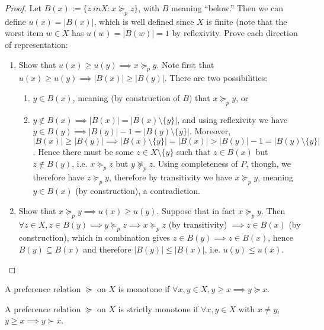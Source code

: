 \begin{proof}
  Let $B(x) := \{ z\ in X : x \succeq_p z \}$, with $B$ meaning
  ``below.'' Then we can define $u(x) = |B(x)|$, which is well defined
  since $X$ is finite (note that the worst item $w \in X$ has $u(w) =
  |B(w)| = 1$ by reflexivity. Prove each direction of representation:
  \begin{enumerate}
  \item Show that $u(x) \geq u(y) \implies x \succeq_p y$. Note
    first that $u(x) \geq u(y) \implies |B(x)| \geq |B(y)|$. There
    are two possibilities:
    \begin{enumerate}
    \item $y \in B(x)$, meaning (by construction of $B$) that $x
      \succeq_p y$, or
    \item $y \not\in B(x) \implies |B(x)| = |B(x) \setminus \{y\}|$,
      and using reflexivity we have $y \in B(y) \implies |B(y)| - 1 =
      |B(y) \setminus \{y\}|$. Moreover, $|B(x)| \geq |B(y)| \implies
      |B(x) \setminus \{y\}| = |B(x)| > |B(y)| - 1 = |B(y) \setminus
      \{y\}|$. Hence there must be some $z \in X \setminus \{y\}$ such
      that $z \in B(x)$ but $z \not\in B(y)$, i.e. $x \succeq_p z$ but
      $y \not\succeq_p z$. Using completeness of $P$, though, we
      therefore have $z \succeq_p y$, therefore by transitivity we
      have $x \succeq_p y$, meaning $y \in B(x)$ (by construction), a
      contradiction.
    \end{enumerate}
  \item Show that $x \succeq_p y \implies u(x) \geq u(y)$. Suppose
    that in fact $x \succeq_p y$. Then $\forall z \in X, z \in B(y)
    \implies y \succeq_p z \implies x \succeq_p z$ (by transitivity)
    $\implies z \in B(x)$ (by construction), which in combination
    gives $z \in B(y) \implies z \in B(x)$, hence $B(y) \subseteq
    B(x)$ and therefore $|B(y)| \leq |B(x)|$, i.e. $u(y) \leq u(x)$.
  \end{enumerate}
\end{proof}

\begin{definition}
  A preference relation $\succeq$ on $X$ is monotone if $\forall x,y \in X, y
  \geq x \implies y \succeq x$.
\end{definition}

\begin{definition}
  A preference relation $\succeq$ on $X$ is strictly monotone if $\forall x,y
  \in X$ with $x \neq y$, $y \geq x \implies y \succ x$.
\end{definition}

